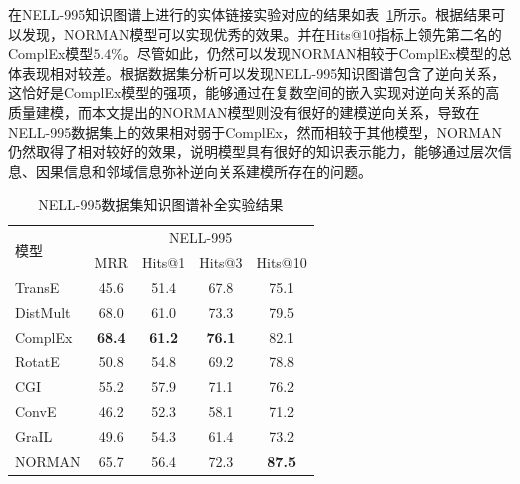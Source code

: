 \documentclass[algorithmlist, AutoFakeBold, AutoFakeSlant, figurelist, tablelist, nomlist, masters]{seuthesix}
\begin{document}
在NELL-995知识图谱上进行的实体链接实验对应的结果如表~\ref{Experiment1_NELL-995}所示。根据结果可以发现，NORMAN模型可以实现优秀的效果。并在Hits@10指标上领先第二名的ComplEx模型$5.4\%$。尽管如此，仍然可以发现NORMAN相较于ComplEx模型的总体表现相对较差。根据数据集分析可以发现NELL-995知识图谱包含了逆向关系，这恰好是ComplEx模型的强项，能够通过在复数空间的嵌入实现对逆向关系的高质量建模，而本文提出的NORMAN模型则没有很好的建模逆向关系，导致在NELL-995数据集上的效果相对弱于ComplEx，然而相较于其他模型，NORMAN仍然取得了相对较好的效果，说明模型具有很好的知识表示能力，能够通过层次信息、因果信息和邻域信息弥补逆向关系建模所存在的问题。
\begin{table}[]
  \centering
  \begin{tabular*}{0.95\textwidth}{@{\extracolsep{\fill}}lcccc}
  \toprule[1pt]
  \multirow{2}{*}{模型} & \multicolumn{4}{c}{NELL-995} \\
    & MRR & Hits@1 & Hits@3 & Hits@10 \\ \hline
  TransE & 45.6 & 51.4 & 67.8 & 75.1 \\
  DistMult & 68.0 & 61.0 & 73.3 & 79.5 \\
  ComplEx & \textbf{68.4} & \textbf{61.2} & \textbf{76.1} & 82.1 \\
  RotatE & 50.8 & 54.8 & 69.2 & 78.8 \\
  CGI & 55.2 & 57.9 & 71.1 & 76.2 \\
  ConvE & 46.2 & 52.3 & 58.1 & 71.2 \\
  GraIL & 49.6 & 54.3 & 61.4 & 73.2 \\
  NORMAN & 65.7 & 56.4 & 72.3 & \textbf{87.5} \\
  \bottomrule[1pt]
  \end{tabular*}
  \caption{NELL-995数据集知识图谱补全实验结果}
  \label{Experiment1_NELL-995}
\end{table}
\end{document}
